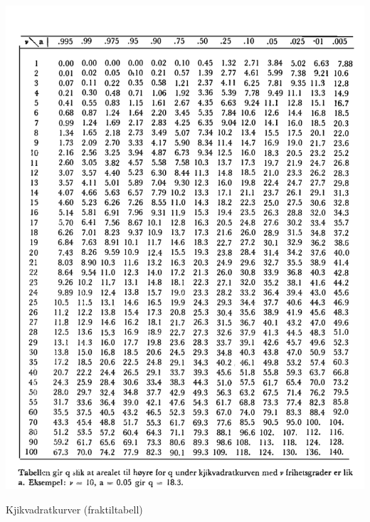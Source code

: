 \begin{table}[H]
\centering
  \includegraphics[scale=1.0]{figurer/Tabell_5b_Kjikvadrat_Fraktiler.pdf}
 \caption{Kjikvadratkurver (fraktiltabell)}
 \label{tab:Kjikvadrat_Fraktiler} %
\end{table}

